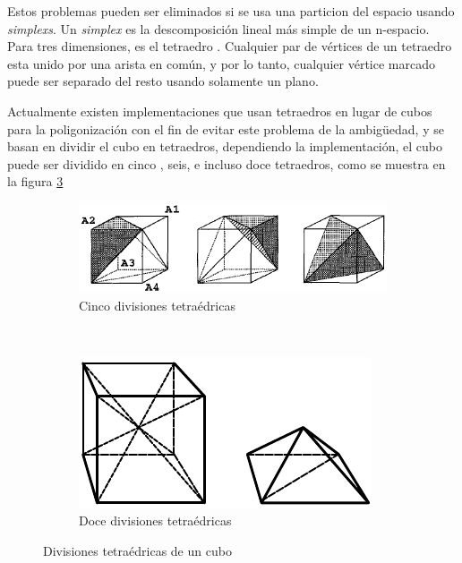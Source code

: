 Estos problemas pueden ser eliminados si se usa una particion del espacio usando \emph{simplexs}.
Un \emph{simplex} es la descomposición lineal más simple de un n-espacio. Para tres dimensiones, es el tetraedro \cite{Bloomenthal88polygonizationof}. Cualquier par de vértices de un tetraedro esta unido por una arista en común, y por lo tanto, cualquier vértice marcado puede ser separado del resto usando solamente un plano.

Actualmente existen implementaciones que usan tetraedros en lugar de cubos para la poligonización con el fin de evitar este problema de la ambigüedad, y se basan en dividir el cubo en tetraedros, dependiendo la implementación, el cubo puede ser dividido en cinco \cite{BAPayne90surfacemapping}, seis, e incluso doce \cite{Bloomenthal88polygonizationof} tetraedros, como se muestra en la figura \ref{f:estadoDelArte:divisionesTetraedricasDeUnCubo}

\begin{figure}[h]

	\begin{subfigure}[b]{0.45\textwidth}
		\centering
		\includegraphics[width=\textwidth]{images/marchingcubes/GueziecHummel95exploitingtriangulated_1.png}
		\caption{Cinco divisiones tetraédricas}
		\label{f:estadoDelArte:cincoDivisionesTetraedricas}
	\end{subfigure}
	~
	\begin{subfigure}[b]{0.45\textwidth}
		\centering
		\includegraphics[width=\textwidth]{images/marchingcubes/Bloomenthal88polygonizationof_2.png}
		\caption{Doce divisiones tetraédricas}
		\label{f:estadoDelArte:doceDivisionesTetraedricas}
	\end{subfigure}

	\caption{Divisiones tetraédricas de un cubo}
	\label{f:estadoDelArte:divisionesTetraedricasDeUnCubo}
\end{figure}

